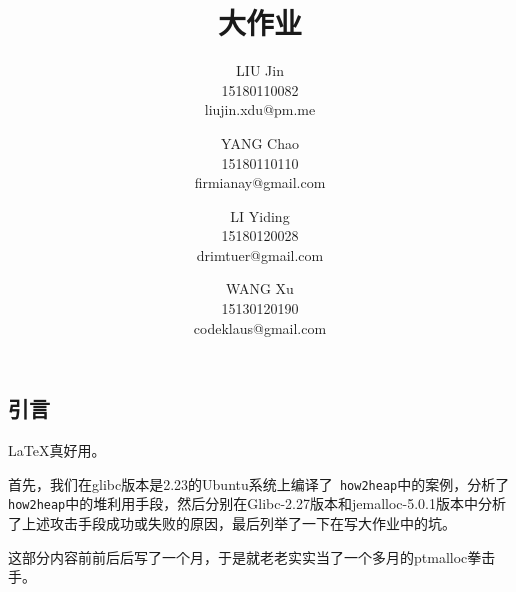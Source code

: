 \documentclass{article}
\title{\classname{} 大作业}
\author{LIU Jin\\
15180110082 \\
liujin.xdu@pm.me \and
YANG Chao\\
15180110110 \\
firmianay@gmail.com \and
LI Yiding\\
15180120028 \\
drimtuer@gmail.com \and
WANG Xu\\
15130120190 \\
codeklaus@gmail.com
}
\begin{document}
\maketitle

\renewcommand{\contentsname}{目录}

\newpage
\tableofcontents
\newpage

\begin{center}
    \section{引言}
\end{center}

\setlength{\parindent}{2em}

 \LaTeX 真好用。
 
 首先，我们在glibc版本是2.23的Ubuntu系统上编译了\verb+ how2heap+中的案例，分析了\verb+ how2heap+中的堆利用手段，然后分别在Glibc-2.27版本和jemalloc-5.0.1版本中分析了上述攻击手段成功或失败的原因，最后列举了一下在写大作业中的坑。
 
 这部分内容前前后后写了一个月，于是就老老实实当了一个多月的ptmalloc拳击手。

\newpage









\end{document}
